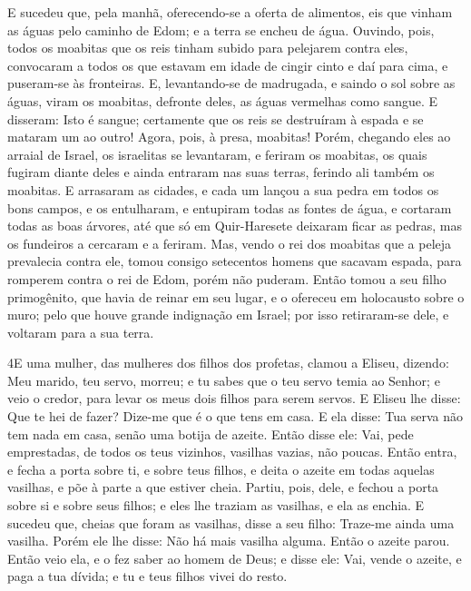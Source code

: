 E sucedeu que, pela manhã, oferecendo-se a oferta de alimentos,
eis que vinham as águas pelo caminho de Edom; e a terra se encheu de
água. Ouvindo, pois, todos os moabitas que os reis tinham
subido para pelejarem contra eles, convocaram a todos os que estavam
em idade de cingir cinto e daí para cima, e puseram-se às
fronteiras. E, levantando-se de madrugada, e saindo o sol
sobre as águas, viram os moabitas, defronte deles, as águas
vermelhas como sangue. E disseram: Isto é sangue; certamente
que os reis se destruíram à espada e se mataram um ao outro! Agora,
pois, à presa, moabitas! Porém, chegando eles ao arraial de
Israel, os israelitas se levantaram, e feriram os moabitas, os quais
fugiram diante deles e ainda entraram nas suas terras, ferindo ali
também os moabitas. E arrasaram as cidades, e cada um lançou
a sua pedra em todos os bons campos, e os entulharam, e entupiram
todas as fontes de água, e cortaram todas as boas árvores, até que
só em Quir-Haresete deixaram ficar as pedras, mas os fundeiros a
cercaram e a feriram. Mas, vendo o rei dos moabitas que a
peleja prevalecia contra ele, tomou consigo setecentos homens que
sacavam espada, para romperem contra o rei de Edom, porém não
puderam. Então tomou a seu filho primogênito, que havia de
reinar em seu lugar, e o ofereceu em holocausto sobre o muro; pelo
que houve grande indignação em Israel; por isso retiraram-se dele, e
voltaram para a sua terra.

\medskip

\lettrine{4} E uma mulher, das mulheres dos filhos dos
profetas, clamou a Eliseu, dizendo: Meu marido, teu servo, morreu; e
tu sabes que o teu servo temia ao Senhor; e veio o credor, para
levar os meus dois filhos para serem servos. E Eliseu lhe disse:
Que te hei de fazer? Dize-me que é o que tens em casa. E ela disse:
Tua serva não tem nada em casa, senão uma botija de azeite.
Então disse ele: Vai, pede emprestadas, de todos os teus
vizinhos, vasilhas vazias, não poucas. Então entra, e fecha a
porta sobre ti, e sobre teus filhos, e deita o azeite em todas
aquelas vasilhas, e põe à parte a que estiver cheia. Partiu,
pois, dele, e fechou a porta sobre si e sobre seus filhos; e eles
lhe traziam as vasilhas, e ela as enchia. E sucedeu que, cheias
que foram as vasilhas, disse a seu filho: Traze-me ainda uma
vasilha. Porém ele lhe disse: Não há mais vasilha alguma. Então o
azeite parou. Então veio ela, e o fez saber ao homem de Deus; e
disse ele: Vai, vende o azeite, e paga a tua dívida; e tu e teus
filhos vivei do resto.

